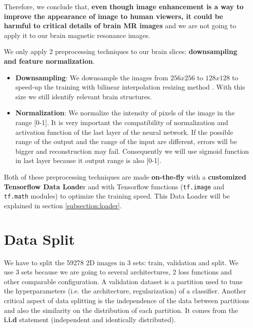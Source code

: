 
Therefore, we conclude that, \textbf{even though image enhancement is a way to improve the appearance of image to human viewers, it could be harmful to critical details of brain MR images} and we are not going to apply it to our brain magnetic resonance images.

We only apply 2 preprocessing techniques to our brain slices: \textbf{downsampling and feature normalization}.
\begin{itemize}
    \item \textbf{Downsampling}: We downsample the images from $256x256$ to $128x128$ to speed-up the training with bilinear interpolation resizing method . With this size we still identify relevant brain structures. 
    \item \textbf{Normalization}: We normalize the intensity of pixels of the image in the range [0-1]. It is very important the compatibility of normalization and activation function of the last layer of the neural network. If the possible range of the output and the range of the input are different, errors will be bigger and reconstruction may fail. Consequently we will use sigmoid function in last layer because it output range is also [0-1].
\end{itemize}

Both of these preprocessing techniques are made \textbf{on-the-fly} with a \textbf{customized Tensorflow Data Loade}r and with Tensorflow functions (\texttt{tf.image} and \texttt{tf.math} modules) to optimize the training speed. This Data Loader will be explained in section \ref{subsection:loader}.

\section{Data Split}
\label{subsection:datasplitting}

We have to split the 59278 2D images in 3 sets: train, validation and split. We use 3 sets because we are going to several architectures, 2 loss functions and other comparable configuration. A validation dataset is a partition used to tune the hyperparameters (i.e. the architecture, regularization) of a classifier. Another critical aspect of data splitting is the independence of the data between partitions and also the similarity on the distribution of each partition. It comes from the \textbf{i.i.d} statement (independent and identically distributed). 

